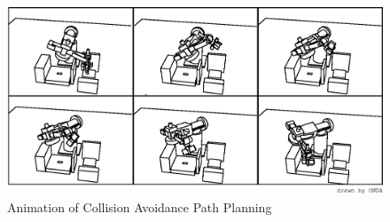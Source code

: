 \begin{figure}
\includegraphics[width=150mm]{fig/eta3colavo.ps}
\caption{Animation of Collision Avoidance Path Planning}
\end{figure}



\newpage
